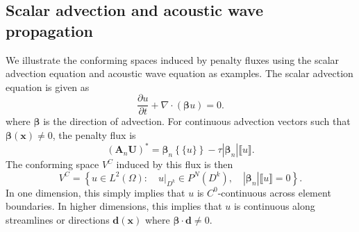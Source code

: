 \documentclass[preprint,10pt]{elsarticle}
\newcommand{\pd}[2]{\frac{\partial#1}{\partial#2}}
\newcommand{\LRp}[1]{\left( #1 \right)}
\newcommand{\LRb}[1]{\left| #1 \right|}
\newcommand{\LRc}[1]{\left\{ #1 \right\}}
\newcommand{\Div} {\ensuremath{\nabla\cdot}}
\newcommand{\jump}[1] {\ensuremath{\llbracket#1\rrbracket}}
\newcommand{\avg}[1] {\ensuremath{\LRc{\!\{#1\}\!}}}
\begin{document}
\subsection{Scalar advection and acoustic wave propagation}
\label{sec:confexamples}
We illustrate the conforming spaces induced by penalty fluxes using the scalar advection equation and acoustic wave equation as examples.  The scalar advection equation is given as
\[
\pd{u}{t} + \Div\LRp{\bm{\beta}u} = 0.
\]
where $\bm{\beta}$ is the direction of advection.  For continuous advection vectors such that $\bm{\beta}(\bm{x}) \neq 0$, the penalty flux is 
\[
(\bm{A}_n\bm{U})^* = \bm{\beta}_n\avg{ u} - \tau\LRb{\bm{\beta}_n}\jump{u}.
\]
The conforming space $V^C$ induced by this flux is then
\[
V^C = \LRc{ u \in L^2\LRp{\Omega} : \quad \left.u\right|_{D^k} \in P^N(D^k), \quad \LRb{\bm{\beta}_n}\jump{u} = 0}.
\]
In one dimension, this simply implies that $u$ is $C^0$-continuous across element boundaries.  In higher dimensions, this implies that $u$ is continuous along streamlines or directions $\bm{d}(\bm{x})$ where $\bm{\beta}\cdot \bm{d} \neq 0$.  
\end{document}
